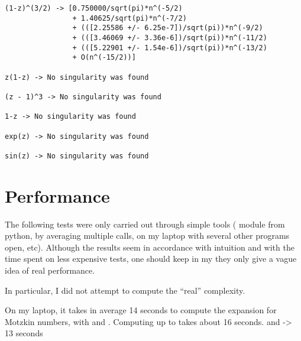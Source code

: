 \documentclass[../main.tex]{subfiles}
\begin{document}
\begin{verbatim}
(1-z)^(3/2) -> [0.750000/sqrt(pi)*n^(-5/2)
				+ 1.40625/sqrt(pi)*n^(-7/2)
				+ (([2.25586 +/- 6.25e-7])/sqrt(pi))*n^(-9/2)
				+ (([3.46069 +/- 3.36e-6])/sqrt(pi))*n^(-11/2)
				+ (([5.22901 +/- 1.54e-6])/sqrt(pi))*n^(-13/2)
				+ O(n^(-15/2))]

z(1-z) -> No singularity was found

(z - 1)^3 -> No singularity was found

1-z -> No singularity was found

exp(z) -> No singularity was found

sin(z) -> No singularity was found
\end{verbatim}

%


\section{Performance}\label{section_implem_perf}


\begin{remark}
	The following tests were only carried out through simple tools ( module from python, by averaging multiple calls, on my laptop with several other programs open, etc). Although the results seem in accordance with intuition and with the time spent on less expensive tests, one should keep in my they only give a vague idea of real performance.
	
	In particular, I did not attempt to compute the ``real'' complexity.
\end{remark}

On my laptop, it takes in average 14 seconds to compute the expansion for Motzkin numbers, with  and . Computing up to  takes about 16 seconds.
 and  -> 13 seconds
\end{document}
